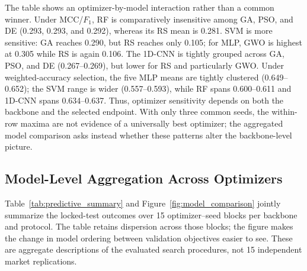 The table shows an optimizer-by-model interaction rather than a common winner. Under MCC/$F_1$, RF is comparatively insensitive among GA, PSO, and DE (0.293, 0.293, and 0.292), whereas its RS mean is 0.281. SVM is more sensitive: GA reaches 0.290, but RS reaches only 0.105; for MLP, GWO is highest at 0.305 while RS is again 0.106. The 1D-CNN is tightly grouped across GA, PSO, and DE (0.267--0.269), but lower for RS and particularly GWO. Under weighted-accuracy selection, the five MLP means are tightly clustered (0.649--0.652); the SVM range is wider (0.557--0.593), while RF spans 0.600--0.611 and 1D-CNN spans 0.634--0.637. Thus, optimizer sensitivity depends on both the backbone and the selected endpoint. With only three common seeds, the within-row maxima are not evidence of a universally best optimizer; the aggregated model comparison asks instead whether these patterns alter the backbone-level picture.

\subsection{Model-Level Aggregation Across Optimizers}

Table~\ref{tab:predictive_summary} and Figure~\ref{fig:model_comparison} jointly summarize the locked-test outcomes over 15 optimizer--seed blocks per backbone and protocol. The table retains dispersion across those blocks; the figure makes the change in model ordering between validation objectives easier to see. These are aggregate descriptions of the evaluated search procedures, not 15 independent market replications.


